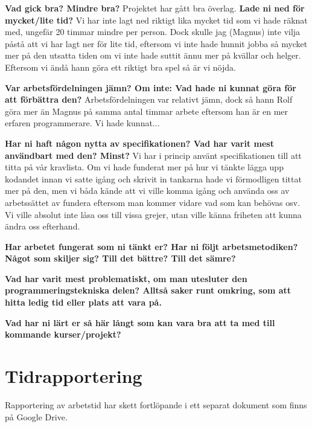 \documentclass{scrartcl}
\begin{document}

\textbf{Vad gick bra? Mindre bra?}
Projektet har gått bra överlag. 
\textbf{Lade ni ned för mycket/lite tid?}
Vi har inte lagt ned riktigt lika mycket tid som vi hade räknat med, ungefär 20 timmar mindre per person. Dock skulle jag (Magnus) inte vilja påstå att vi har lagt ner för lite tid, eftersom vi inte hade hunnit jobba så mycket mer på den utsatta tiden om vi inte hade suttit ännu mer på kvällar och helger. Eftersom vi ändå hann göra ett riktigt bra spel så är vi nöjda. 

\textbf{Var arbetsfördelningen jämn? Om inte: Vad hade ni kunnat göra för att förbättra den?}
Arbetsfördelningen var relativt jämn, dock så hann Rolf göra mer än Magnus på samma antal timmar arbete eftersom han är en mer erfaren programmerare. Vi hade kunnat...

\textbf{Har ni haft någon nytta av specifikationen? Vad har varit mest användbart med den? Minst?}
Vi har i princip använt specifikationen till att titta på vår kravlista. Om vi hade funderat mer på hur vi tänkte lägga upp kodandet innan vi satte igång och skrivit in tankarna hade vi förmodligen tittat mer på den, men vi båda kände att vi ville komma igång och använda oss av arbetssättet av fundera eftersom man kommer vidare vad som kan behövas osv. Vi ville absolut inte låsa oss till vissa grejer, utan ville känna friheten att kunna ändra oss efterhand. 

\textbf{Har arbetet fungerat som ni tänkt er? Har ni följt arbetsmetodiken? Något som skiljer sig? Till det bättre? Till det sämre?}

\textbf{Vad har varit mest problematiskt, om man utesluter den programmeringstekniska delen? Alltså saker runt omkring, som att hitta ledig tid eller plats att vara på.}

\textbf{Vad har ni lärt er så här långt som kan vara bra att ta med till kommande kurser/projekt?}

\section{Tidrapportering}
Rapportering av arbetstid har skett fortlöpande i ett separat dokument som finns på Google Drive.
\end{document}
